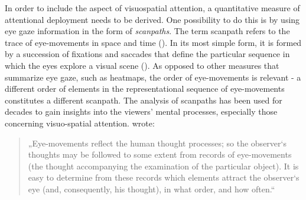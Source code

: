 \documentclass[a4paper, 12pt]{scrreprt}
\begin{document}
In order to include the aspect of visuospatial attention, a quantitative measure of attentional deployment needs to be derived. One possibility to do this is by using eye gaze information in the form of \textit{scanpaths}.
The term scanpath refers to the trace of eye-movements in space and time (\cite{holmqvist2011eye}). In its most simple form, it is formed by a succession of fixations and saccades that define the particular sequence in which the eyes explore a visual scene (\cite{anderson2015comparison}). As opposed to other measures that summarize eye gaze, such as heatmaps, the order of eye-movements is relevant - a different order of elements in the representational sequence of eye-movements constitutes a different scanpath. \newline
The analysis of scanpaths has been used for decades to gain insights into the viewers’ mental processes, especially those concerning visuo-spatial attention. \textcite{yarbus1967eye} wrote: 

\begin{quotation}
\footnotesize{„Eye-movements reflect the human thought processes; so the observer‘s thoughts may be followed to some extent from records of eye-movements (the thought accompanying the examination of the particular object). It is easy to determine from these records which elements attract the observer‘s eye (and, consequently, his thought), in what order, and how often.“}
\end{quotation}
\end{document}
